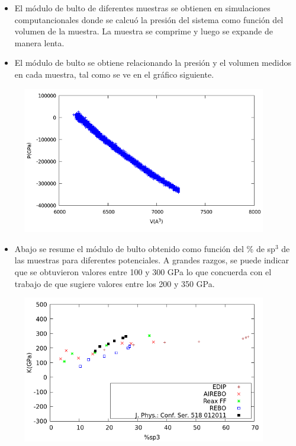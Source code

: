 \documentclass[a0]{sciposter}
\begin{document}
\begin{multicols}{2}
\begin{itemize}
    \item El m\'odulo de bulto de diferentes muestras se obtienen en simulaciones computancionales donde se calcu\'o la presi\'on del sistema como funci\'on del volumen de la muestra. La muestra se comprime y luego se expande de manera lenta.\\
\item El módulo de bulto se obtiene relacionando la presión y el volumen medidos en cada muestra, tal como se ve en el gr\'afico siguiente. \\
\end{itemize}
\begin{figure}
        \includegraphics[width=0.95\textwidth]{bulk.png}
        \label{fig:bulkproc}
\end{figure}
\begin{itemize}
    \item Abajo se resume el m\'odulo de bulto obtenido como funci\'on del \% de sp$^3$ de  las muestras para diferentes potenciales. A grandes razgos, se puede indicar que se obtuvieron valores entre 100 y 300 GPa  lo que concuerda con el trabajo de \cite{RefBulk} que sugiere valores entre los 200 y 350 GPa. \\
    \end{itemize}

\begin{figure}
        \includegraphics[width=0.95\textwidth]{databulk.png}
        \label{fig:bulkdata}
\end{figure}


\end{multicols}
\end{document}
